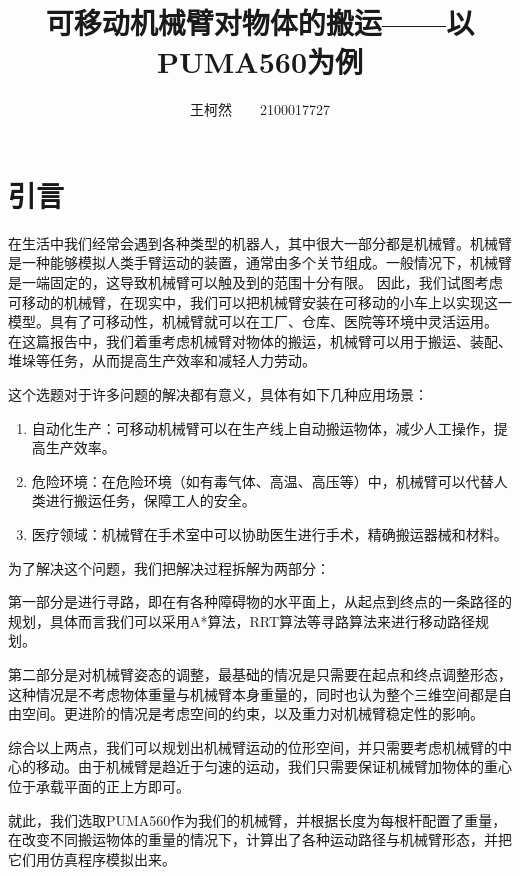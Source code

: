 \documentclass[conference]{IEEEtran}
\begin{document}
\title{可移动机械臂对物体的搬运——以PUMA560为例}
\author{王柯然\ \ \ \ 2100017727}

\maketitle

\section{引言}
在生活中我们经常会遇到各种类型的机器人，其中很大一部分都是机械臂。机械臂是一种能够模拟人类手臂运动的装置，通常由多个关节组成。一般情况下，机械臂是一端固定的，这导致机械臂可以触及到的范围十分有限。
因此，我们试图考虑可移动的机械臂，在现实中，我们可以把机械臂安装在可移动的小车上以实现这一模型。具有了可移动性，机械臂就可以在工厂、仓库、医院等环境中灵活运用。
在这篇报告中，我们着重考虑机械臂对物体的搬运，机械臂可以用于搬运、装配、堆垛等任务，从而提高生产效率和减轻人力劳动。

这个选题对于许多问题的解决都有意义，具体有如下几种应用场景：
\begin{enumerate}
    \item 自动化生产：可移动机械臂可以在生产线上自动搬运物体，减少人工操作，提高生产效率。
    \item 危险环境：在危险环境（如有毒气体、高温、高压等）中，机械臂可以代替人类进行搬运任务，保障工人的安全。
    \item 医疗领域：机械臂在手术室中可以协助医生进行手术，精确搬运器械和材料。
\end{enumerate}

为了解决这个问题，我们把解决过程拆解为两部分：

第一部分是进行寻路，即在有各种障碍物的水平面上，从起点到终点的一条路径的规划，具体而言我们可以采用A*算法，RRT算法等寻路算法来进行移动路径规划。

第二部分是对机械臂姿态的调整，最基础的情况是只需要在起点和终点调整形态，这种情况是不考虑物体重量与机械臂本身重量的，同时也认为整个三维空间都是自由空间。更进阶的情况是考虑空间的约束，以及重力对机械臂稳定性的影响。

综合以上两点，我们可以规划出机械臂运动的位形空间，并只需要考虑机械臂的中心的移动。由于机械臂是趋近于匀速的运动，我们只需要保证机械臂加物体的重心位于承载平面的正上方即可。

就此，我们选取PUMA560作为我们的机械臂，并根据长度为每根杆配置了重量，在改变不同搬运物体的重量的情况下，计算出了各种运动路径与机械臂形态，并把它们用仿真程序模拟出来。
\end{document}
